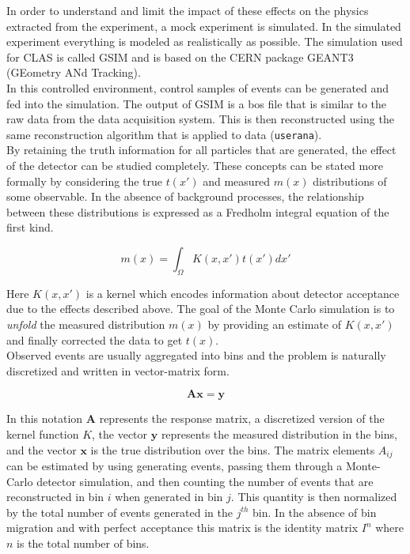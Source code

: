 In order to understand and limit the impact of these effects on the physics extracted from the experiment, a mock experiment is simulated.  In the simulated experiment everything is modeled as realistically as possible.  The simulation used for CLAS is called GSIM and is based on the CERN package GEANT3 (GEometry ANd Tracking).\\
In this controlled environment, control samples of events can be generated and fed into the simulation.  The output of GSIM is a bos file that is similar to the raw data from the data acquisition system. This is then reconstructed using the same reconstruction algorithm that is applied to data (\texttt{userana}).  \\ 
By retaining the truth information for all particles that are generated, the effect of the detector can be studied completely.  These concepts can be stated more formally by considering the true $t(x')$ and measured $m(x)$ distributions of some observable.  In the absence of background processes, the relationship between these distributions is expressed as a Fredholm integral equation of the first kind.

\begin{equation}
	m(x) = \int_{\Omega} K(x,x') t(x') dx'
\end{equation}
    
Here $K(x,x')$ is a kernel which encodes information about detector acceptance due to the effects described above.  The goal of the Monte Carlo simulation is to \textit{unfold} the measured distribution $m(x)$ by providing an estimate of $K(x,x')$ and finally corrected the data to get $t(x)$.\\
Observed events are usually aggregated into bins and the problem is naturally discretized and written in vector-matrix form.

\begin{equation}
	\mathbf{A} \mathbf{x} = \mathbf{y}
\end{equation}        

In this notation $\mathbf{A}$ represents the response matrix, a discretized version of the kernel function $K$, the vector $\mathbf{y}$ represents the measured distribution in the bins, and the vector $\mathbf{x}$ is the true distribution over the bins.  The matrix elements $A_{ij}$ can be estimated by using generating events, passing them through a Monte-Carlo detector simulation, and then counting the number of events that are reconstructed in bin $i$ when generated in bin $j$.  This quantity is then normalized by the total number of events generated in the $j^{th}$ bin.  In the absence of bin migration and with perfect acceptance this matrix is the identity matrix $I^{n}$ where $n$ is the total number of bins. \\

